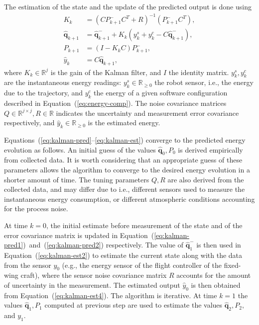 \documentclass[letterpaper,10pt,conference]{ieeeconf}
\begin{document}
The estimation of the state and the update of the predicted output is done using
\begin{subequations}\label{eq:kalman-est}\begin{align}
  K_k&=(CP_{k+1}^-C^T+R)^{-1}(P_{k+1}^-C^T),\\
  \hat{\mathbf{q}}_{k+1}&=\hat{\mathbf{q}}_{k+1}^-+K_k(y_k^s+y_k^c-C\hat{\mathbf{q}}_{k+1}^-),\label{eq:kalman-est2}\\
  P_{k+1}&=(I-K_kC)P_{k+1}^-,\\
  \hat{y}_k&=C\hat{\mathbf{q}}_{k+1},\label{eq:kalman-est4}
\end{align}
\end{subequations}
where $K_k\in\mathbb{R}^j$ is the gain of the Kalman filter, and $I$ the identity matrix. $y_k^s,y_k^c$ are the instantaneous energy readings: $y_k^s\in\mathbb{R}_{\geq 0}$ the robot sensor, i.e., the energy due to the trajectory, and $y_k^c$ the energy of a given software configuration described in Equation~(\ref{eq:energy-comp}). The noise covariance matrices $Q\in\mathbb{R}^{j\times j},R\in\mathbb{R}$ indicates the uncertainty and measurement error covariance respectively, and $\hat{y}_k\in\mathbb{R}_{\geq 0}$ is the estimated energy.

Equations~(\ref{eq:kalman-pred}--\ref{eq:kalman-est}) converge to the predicted energy evolution as follows. An initial guess of the values $\hat{\mathbf{q}}_0,P_0$ is derived empirically from collected data. It is worth considering that an appropriate guess of these parameters allows the algorithm to converge to the desired energy evolution in a shorter amount of time. The tuning parameters $Q,R$ are also derived from the collected data, and may differ due to i.e., different sensors used to measure the instantaneous energy consumption, or different atmospheric conditions accounting for the process noise.

At time $k=0$, the initial estimate before measurement of the state and of the error covariance matrix is updated in Equation~(\ref{eq:kalman-pred1})~and~(\ref{eq:kalman-pred2}) respectively. The value of $\hat{\mathbf{q}}_1^-$ is then used in Equation~(\ref{eq:kalman-est2}) to estimate the current state along with the data from the sensor $y_0$ (e.g., the energy sensor of the flight controller of the fixed-wing craft), where the sensor noise covariance matrix $R$ accounts for the amount of uncertainty in the measurement. The estimated output $\hat{y}_0$ is then obtained from Equation~(\ref{eq:kalman-est4}). The algorithm is iterative. At time $k=1$ the values $\hat{\mathbf{q}}_1,P_1$ computed at previous step are used to estimate the values $\hat{\mathbf{q}}_2,P_2,$ and $y_1$.
\end{document}

